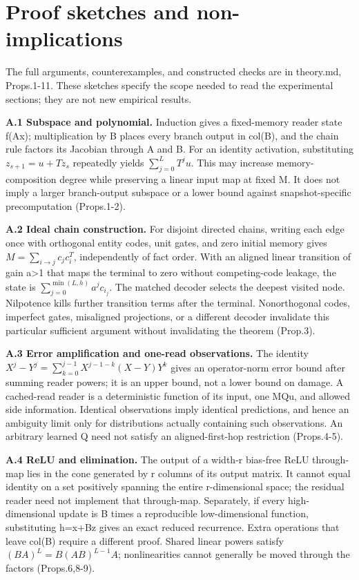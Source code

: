 \section{Proof sketches and non-implications}\label{app:A}

The full arguments, counterexamples, and constructed checks are in
theory.md, Props.1-11. These sketches specify the scope needed
to read the experimental sections; they are not new empirical results.

\textbf{A.1 Subspace and polynomial.} Induction gives a fixed-memory reader state
f(Ax); multiplication by B places every branch output in col(B), and the chain
rule factors its Jacobian through A and B. For an identity activation, substituting
\(z_{s+1}=u+Tz_s\) repeatedly yields \(\sum_{j=0}^{L}T^j u\). This may increase
memory-composition degree while preserving a linear input map at fixed M. It does
not imply a larger branch-output subspace or a lower bound against snapshot-specific
precomputation (Props.1-2).

\textbf{A.2 Ideal chain construction.} For disjoint directed chains, writing each edge
once with orthogonal entity codes, unit gates, and zero initial memory gives
\(M=\sum_{i\to j}c_jc_i^T\), independently of fact order. With an aligned linear
transition of gain a>1 that maps the terminal to zero without competing-code
leakage, the state is \(\sum_{j=0}^{\min(L,h)}a^j c_{i_j}\).
The matched decoder selects the deepest visited node. Nilpotence kills further
transition terms after the terminal. Nonorthogonal codes, imperfect gates,
misaligned projections, or a different decoder invalidate this particular
sufficient argument without invalidating the theorem (Prop.3).

\textbf{A.3 Error amplification and one-read observations.} The identity
\(X^j-Y^j=\sum_{k=0}^{j-1}X^{j-1-k}(X-Y)Y^k\) gives an operator-norm error bound
after summing reader powers; it is an upper bound, not a lower bound on damage.
A cached-read reader is a deterministic function of its input, one MQu, and allowed
side information. Identical observations imply identical predictions, and hence
an ambiguity limit only for distributions actually containing such observations.
An arbitrary learned Q need not satisfy an aligned-first-hop restriction
(Props.4-5).

\textbf{A.4 ReLU and elimination.} The output of a width-r bias-free ReLU through-map
lies in the cone generated by r columns of its output matrix. It cannot equal
identity on a set positively spanning the entire r-dimensional space; the
residual reader need not implement that through-map. Separately, if every
high-dimensional update is B times a reproducible low-dimensional function,
substituting h=x+Bz gives an exact reduced recurrence. Extra operations that
leave col(B) require a different proof. Shared linear powers satisfy
\((BA)^L=B(AB)^{L-1}A\); nonlinearities cannot generally be moved through the
factors (Props.6,8-9).

